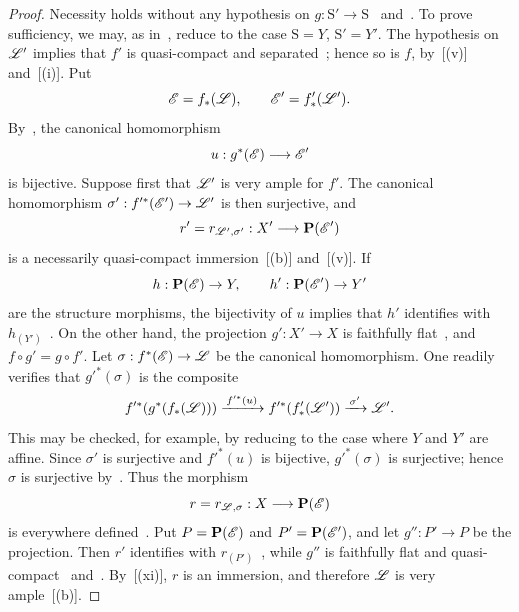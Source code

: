 \begin{proof}
Necessity holds without any hypothesis on
$g:\mathrm{S}'\to\mathrm{S}$~
and~. To prove sufficiency, we may, as
in~, reduce to the case $\mathrm{S}=Y$,
$\mathrm{S}'=Y'$. The hypothesis on $\mathscr{L}'$ implies that $f'$ is
quasi-compact and separated~; hence so is $f$,
by~[(v)] and~[(i)]. Put
\[
  \mathscr{E}=f_*(\mathscr{L}),\qquad
  \mathscr{E}'=f'_*(\mathscr{L}').
\]
By~, the canonical homomorphism
\[
  u:g^*(\mathscr{E})\longrightarrow\mathscr{E}'
\]
is bijective. Suppose first that $\mathscr{L}'$ is very ample for $f'$. The
canonical homomorphism
$\sigma':f'^*(\mathscr{E}')\to\mathscr{L}'$ is then surjective, and
\[
  r'=r_{\mathscr{L}',\sigma'}:X'\longrightarrow\mathbf{P}(\mathscr{E}')
\]
is a necessarily quasi-compact immersion~[(b)]
and~[(v)]. If
\[
  h:\mathbf{P}(\mathscr{E})\to Y,\qquad
  h':\mathbf{P}(\mathscr{E}')\to Y'
\]
are the structure morphisms, the bijectivity of $u$ implies that $h'$
identifies with $h_{(Y')}$~. On the other hand,
the projection $g':X'\to X$ is faithfully flat~, and
$f\circ g'=g\circ f'$. Let
$\sigma:f^*(\mathscr{E})\to\mathscr{L}$ be the canonical homomorphism. One
readily verifies that $g'^*(\sigma)$ is the composite
\[
  f'^*\!\left(g^*\!\left(f_*(\mathscr{L})\right)\right)
    \xrightarrow{\,f'^*(u)\,}
  f'^*\!\left(f'_*(\mathscr{L}')\right)
    \xrightarrow{\,\sigma'\,}
  \mathscr{L}' .
\]
This may be checked, for example, by reducing to the case where $Y$
and $Y'$ are affine. Since $\sigma'$ is surjective and $f'^*(u)$ is
bijective, $g'^*(\sigma)$ is surjective; hence $\sigma$ is surjective
by~. Thus the morphism
\[
  r=r_{\mathscr{L},\sigma}:X\longrightarrow\mathbf{P}(\mathscr{E})
\]
is everywhere defined~. Put
$P=\mathbf{P}(\mathscr{E})$ and $P'=\mathbf{P}(\mathscr{E}')$, and let
$g'':P'\to P$ be the projection. Then $r'$ identifies with
$r_{(P')}$~, while $g''$ is faithfully flat and
quasi-compact~ and~.
By~[(xi)], $r$ is an immersion, and therefore
$\mathscr{L}$ is very ample~[(b)].


\end{proof}
